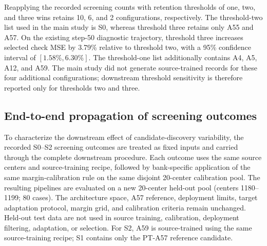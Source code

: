 \documentclass[11pt,a4paper]{article}
\begin{document}
Reapplying the recorded screening counts with retention thresholds of one,
two, and three wins retains 10, 6, and 2 configurations, respectively. The threshold-two list used in the main study is S0, whereas threshold three retains only A55 and
A57. On the existing step-50 diagnostic trajectory, threshold three increases
selected check MSE by 3.79\% relative to threshold two, with a 95\% confidence
interval of $[1.58\%,6.30\%]$. The threshold-one list additionally contains A4, A5, A12, and A59. The main study did not generate source-trained records for these four
additional configurations; downstream threshold sensitivity is therefore
reported only for thresholds two and three.

\subsection{End-to-end propagation of screening outcomes}

To characterize the downstream effect of candidate-discovery variability,
the recorded S0--S2 screening outcomes are treated as fixed inputs and carried
through the complete downstream procedure. Each outcome uses the same source
centers and source-training recipe, followed by bank-specific application of the same margin-calibration rule on the same disjoint 20-center
calibration pool. The resulting pipelines are evaluated on a new 20-center
held-out pool (centers 1180--1199; 80 cases). The architecture space, A57
reference, deployment limits, target adaptation protocol, margin grid, and
calibration criteria remain unchanged. Held-out test data are not used in
source training, calibration, deployment filtering, adaptation, or selection.
For S2, A59 is source-trained using the same source-training recipe; S1
contains only the PT-A57 reference candidate.
\end{document}
